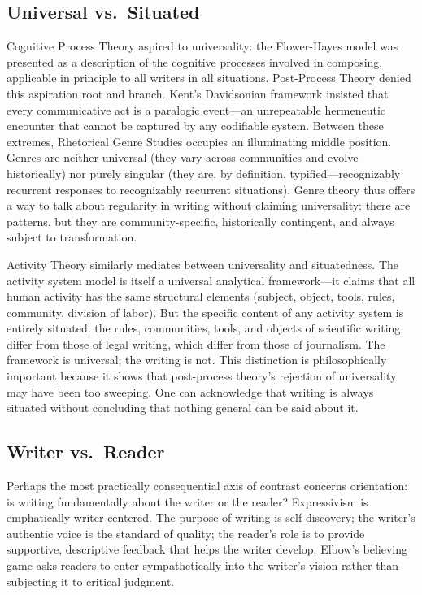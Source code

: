 \documentclass[12pt]{article}
\begin{document}
\subsection{Universal vs.\ Situated}

Cognitive Process Theory aspired to universality: the Flower-Hayes model was presented as a description of the cognitive processes involved in composing, applicable in principle to all writers in all situations. Post-Process Theory denied this aspiration root and branch. Kent's Davidsonian framework insisted that every communicative act is a paralogic event---an unrepeatable hermeneutic encounter that cannot be captured by any codifiable system. Between these extremes, Rhetorical Genre Studies occupies an illuminating middle position. Genres are neither universal (they vary across communities and evolve historically) nor purely singular (they are, by definition, typified---recognizably recurrent responses to recognizably recurrent situations). Genre theory thus offers a way to talk about regularity in writing without claiming universality: there are patterns, but they are community-specific, historically contingent, and always subject to transformation.

Activity Theory similarly mediates between universality and situatedness. The activity system model is itself a universal analytical framework---it claims that all human activity has the same structural elements (subject, object, tools, rules, community, division of labor). But the specific content of any activity system is entirely situated: the rules, communities, tools, and objects of scientific writing differ from those of legal writing, which differ from those of journalism. The framework is universal; the writing is not. This distinction is philosophically important because it shows that post-process theory's rejection of universality may have been too sweeping. One can acknowledge that writing is always situated without concluding that nothing general can be said about it.

\subsection{Writer vs.\ Reader}

Perhaps the most practically consequential axis of contrast concerns orientation: is writing fundamentally about the writer or the reader? Expressivism is emphatically writer-centered. The purpose of writing is self-discovery; the writer's authentic voice is the standard of quality; the reader's role is to provide supportive, descriptive feedback that helps the writer develop. Elbow's believing game asks readers to enter sympathetically into the writer's vision rather than subjecting it to critical judgment.
\end{document}
